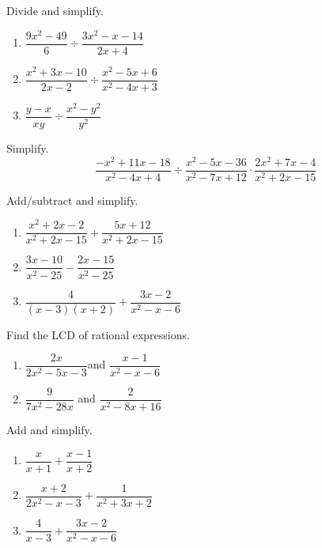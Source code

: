 \documentclass[
  en,11pt]{elegantbook}
\let\BeginKnitrBlock\begin \let\EndKnitrBlock\end
\begin{document}
\BeginKnitrBlock{exercise}
\protect\hypertarget{exr:unnamed-chunk-57}{}{\label{exr:unnamed-chunk-57} }
Divide and simplify.

\begin{enumerate}
\def\labelenumi{\arabic{enumi}.}
\item
  \(\dfrac{9x^2-49}{6}\div\dfrac{3x^2-x-14}{2x+4}\)
\item
  \(\dfrac{x^2+3x-10}{2x-2}\div\dfrac{x^2-5x+6}{x^2-4x+3}\)
\item
  \(\dfrac{y-x}{xy}\div\dfrac{x^2-y^2}{y^2}\)
\end{enumerate}
\EndKnitrBlock{exercise}

\BeginKnitrBlock{exercise}
\protect\hypertarget{exr:unnamed-chunk-58}{}{\label{exr:unnamed-chunk-58} }
Simplify.
\[
\frac{-x^2+11x-18}{x^2-4x+4}\div \frac{x^2-5x-36}{x^2-7x+12}\cdot \frac{2x^2+7x-4}{x^2+2x-15}
\]
\EndKnitrBlock{exercise}

\BeginKnitrBlock{exercise}
\protect\hypertarget{exr:unnamed-chunk-59}{}{\label{exr:unnamed-chunk-59} }
Add/subtract and simplify.

\begin{enumerate}
\def\labelenumi{\arabic{enumi}.}

\item
  \(\dfrac{x^2+2x-2}{x^2+2x-15}+\dfrac{5x+12}{x^2+2x-15}\)
\item
  \(\dfrac{3x-10}{x^2-25}-\dfrac{2x-15}{x^2-25}\)
\item
  \(\dfrac{4}{(x-3)(x+2)}+\dfrac{3x-2}{x^2-x-6}\)
\end{enumerate}
\EndKnitrBlock{exercise}

\BeginKnitrBlock{exercise}
\protect\hypertarget{exr:unnamed-chunk-60}{}{\label{exr:unnamed-chunk-60} }
Find the LCD of rational expressions.

\begin{enumerate}
\def\labelenumi{\arabic{enumi}.}

\item
  \(\dfrac{2x}{2x^2-5x-3}\)\quad and \quad \(\dfrac{x-1}{x^2-x-6}\)
\item
  \(\dfrac{9}{7x^2-28x}\) \quad and \quad \(\dfrac{2}{x^2-8x+16}\)
\end{enumerate}
\EndKnitrBlock{exercise}

\BeginKnitrBlock{exercise}
\protect\hypertarget{exr:unnamed-chunk-61}{}{\label{exr:unnamed-chunk-61} }
Add and simplify.

\begin{enumerate}
\def\labelenumi{\arabic{enumi}.}

\item
  \(\dfrac{x}{x+1}+\dfrac{x-1}{x+2}\)
\item
  \(\dfrac{x+2}{2x^2-x-3}+\dfrac{1}{x^2+3x+2}\)
\item
  \(\dfrac{4}{x-3}+\dfrac{3x-2}{x^2-x-6}\)
\end{enumerate}
\EndKnitrBlock{exercise}
\end{document}

